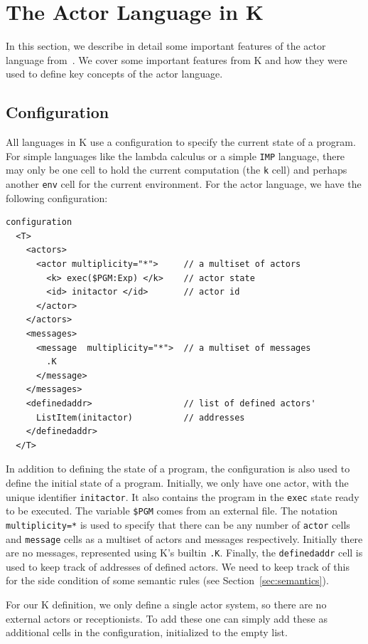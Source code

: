 \documentclass{llncs}
\begin{document}
\section{The Actor Language in K}
In this section, we describe in detail some important features of the actor
language from~\cite{}. We cover some important features from K and how they were
used to define key concepts of the actor language.

\subsection{Configuration}
All languages in K use a configuration to specify the current state of a
program. For simple languages like the lambda calculus or a simple \texttt{IMP}
language, there may only be one cell to hold the current computation (the
\texttt{k} cell) and perhaps another \texttt{env} cell for the current
environment. For the actor language, we have the following configuration:
\begin{verbatim}
configuration 
  <T>
    <actors>
      <actor multiplicity="*">     // a multiset of actors
        <k> exec($PGM:Exp) </k>    // actor state
        <id> initactor </id>       // actor id
      </actor>
    </actors>
    <messages>
      <message  multiplicity="*">  // a multiset of messages
        .K
      </message>
    </messages>
    <definedaddr>                  // list of defined actors'
      ListItem(initactor)          // addresses
    </definedaddr>
  </T>
\end{verbatim}
In addition to defining the state of a program, the configuration is also used
to define the initial state of a program. Initially, we only have one actor,
with the unique identifier \texttt{initactor}. It also contains the program in
the \texttt{exec} state ready to be executed. The variable \texttt{\$PGM} comes
from an external file. The notation \texttt{multiplicity=*} is used to specify
that there can be any number of \texttt{actor} cells and \texttt{message} cells
as a multiset of actors and messages respectively. Initially there are no
messages, represented using K's builtin \texttt{.K}. Finally, the
\texttt{definedaddr} cell is used to keep track of addresses of defined
actors. We need to keep track of this for the side condition of some semantic
rules (see Section~\ref{sec:semantics}).

For our K definition, we only define a single actor system, so there are no
external actors or receptionists. To add these one can simply add these as
additional cells in the configuration, initialized to the empty list.
\end{document}

